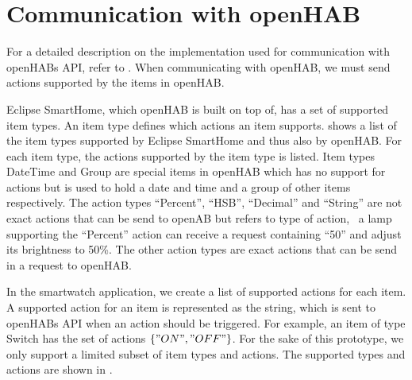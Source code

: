 \section{Communication with openHAB}
\label{sec:design:communication-with-openhab}

For a detailed description on the implementation used for communication with openHABs API, refer to . When communicating with openHAB, we must send actions supported by the items in openHAB.

Eclipse SmartHome, which openHAB is built on top of, has a set of supported item types. An item type defines which actions an item supports.  shows a list of the item types supported by Eclipse SmartHome and thus also by openHAB. For each item type, the actions supported by the item type is listed. Item types DateTime and Group are special items in openHAB which has no support for actions but is used to hold a date and time and a group of other items respectively.
The action types ``Percent'', ``HSB'', ``Decimal'' and ``String'' are not exact actions that can be send to openAB but refers to type of action, \eg~a lamp supporting the ``Percent'' action can receive a request containing ``50'' and adjust its brightness to 50\%. The other action types are exact actions that can be send in a request to openHAB.

In the smartwatch application, we create a list of supported actions for each item. A supported action for an item is represented as the string, which is sent to openHABs API when an action should be triggered. For example, an item of type Switch has the set of actions $\{ "ON", "OFF" \}$. For the sake of this prototype, we only support a limited subset of item types and actions. The supported types and actions are shown in .

